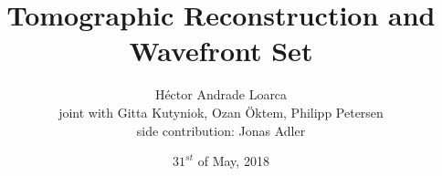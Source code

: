 \title[Tomographic Reconstruction and Wavefront Set]{Tomographic Reconstruction and Wavefront Set}
\author{H\'ector Andrade Loarca\\
				\scriptsize{joint with Gitta Kutyniok, Ozan \"Oktem, Philipp Petersen}\\
				\scriptsize{side contribution: Jonas Adler}}
\date{$31^{st}$ of May, 2018}


\newcommand{\mylogo}{\texttt{[image: ./Images/AFG.pdf]}}

\begin{frame}[plain]
	\titlepage
\end{frame}

